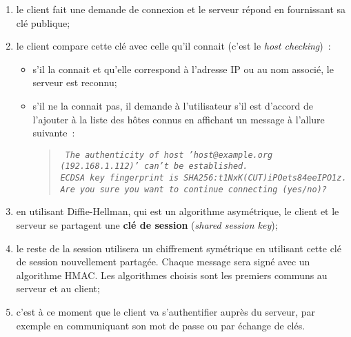 \documentclass[a4paper,11pt]{article}
\begin{document}
\begin{enumerate}
	
	\item le client fait une demande de connexion et le serveur répond en
		fournissant sa clé publique;
	\item le client compare cette clé avec celle qu'il connait (c'est le
		\textit{host checking})~:
		\begin{itemize}			
			\item s'il la connait et qu'elle correspond à l'adresse IP ou au
				nom associé, le serveur est reconnu;
			\item s'il ne la connait pas, il demande à l'utilisateur s'il est
				d'accord de l'ajouter à la liste des hôtes connus en affichant
				un message à l'allure suivante~:

				\begin{quote}
					\it\tt \small
					The authenticity of host 'host@example.org (192.168.1.112)' 
					can't be established.\\
					ECDSA key fingerprint is SHA256:t1NxK(CUT)iPOets84eeIPO1z.\\
					Are you sure you want to continue connecting (yes/no)? 
				\end{quote}
		\end{itemize}

	\item en utilisant Diffie-Hellman, qui est un algorithme asymétrique, le
		client et le serveur se partagent une \textbf{clé de session}
		(\textit{shared session key});

	\item le reste de la session utilisera un chiffrement symétrique en
		utilisant cette clé de session nouvellement partagée. Chaque message
		sera signé avec un algorithme HMAC.  Les algorithmes choisis sont les
		premiers communs au serveur et au client;

	\item c'est à ce moment que le client va s'authentifier auprès du serveur,
		par exemple en communiquant son mot de passe ou par échange de clés. 

\end{enumerate}
\end{document}
